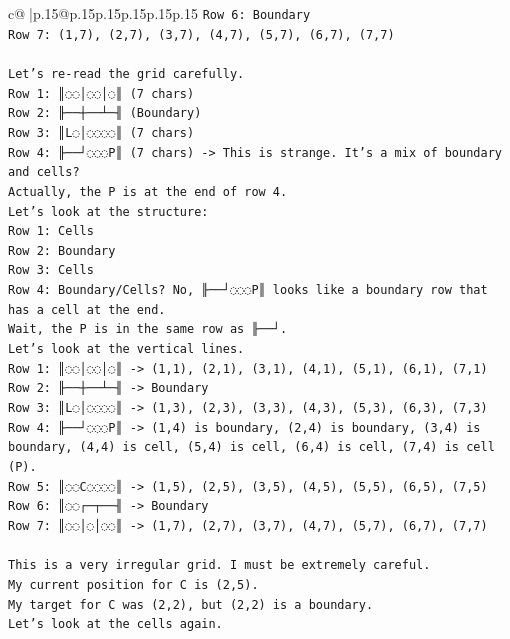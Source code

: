 \documentclass{article}
\begin{document}
{\begin{supertabular}{c@{$\;$}|p{.15\linewidth}@{}p{.15\linewidth}p{.15\linewidth}p{.15\linewidth}p{.15\linewidth}p{.15\linewidth}}
{{{\texttt{Row 6: Boundary} \\
\texttt{Row 7: (1,7), (2,7), (3,7), (4,7), (5,7), (6,7), (7,7)} \\
\\ 
\texttt{Let's re{-}read the grid carefully.} \\
\texttt{Row 1: ║◌◌│◌◌│◌║ (7 chars)} \\
\texttt{Row 2: ╟──┼──┴─╢ (Boundary)} \\
\texttt{Row 3: ║L◌│◌◌◌◌║ (7 chars)} \\
\texttt{Row 4: ╟──┘◌◌◌P║ (7 chars) {-}> This is strange. It's a mix of boundary and cells?} \\
\texttt{Actually, the P is at the end of row 4.} \\
\texttt{Let's look at the structure:} \\
\texttt{Row 1: Cells} \\
\texttt{Row 2: Boundary} \\
\texttt{Row 3: Cells} \\
\texttt{Row 4: Boundary/Cells? No, ╟──┘◌◌◌P║ looks like a boundary row that has a cell at the end.} \\
\texttt{Wait, the P is in the same row as ╟──┘.} \\
\texttt{Let's look at the vertical lines.} \\
\texttt{Row 1: ║◌◌│◌◌│◌║ {-}> (1,1), (2,1), (3,1), (4,1), (5,1), (6,1), (7,1)} \\
\texttt{Row 2: ╟──┼──┴─╢ {-}> Boundary} \\
\texttt{Row 3: ║L◌│◌◌◌◌║ {-}> (1,3), (2,3), (3,3), (4,3), (5,3), (6,3), (7,3)} \\
\texttt{Row 4: ╟──┘◌◌◌P║ {-}> (1,4) is boundary, (2,4) is boundary, (3,4) is boundary, (4,4) is cell, (5,4) is cell, (6,4) is cell, (7,4) is cell (P).} \\
\texttt{Row 5: ║◌◌C◌◌◌◌║ {-}> (1,5), (2,5), (3,5), (4,5), (5,5), (6,5), (7,5)} \\
\texttt{Row 6: ║◌◌┌─┬──╢ {-}> Boundary} \\
\texttt{Row 7: ║◌◌│◌│◌◌║ {-}> (1,7), (2,7), (3,7), (4,7), (5,7), (6,7), (7,7)} \\
\\ 
\texttt{This is a very irregular grid. I must be extremely careful.} \\
\texttt{My current position for C is (2,5).} \\
\texttt{My target for C was (2,2), but (2,2) is a boundary.} \\
\texttt{Let's look at the cells again.} \\
}}}
\end{supertabular}}
\end{document}
